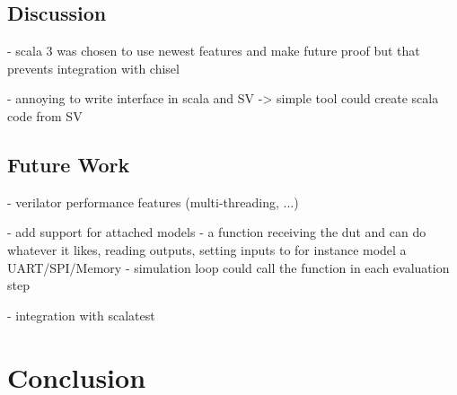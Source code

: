 \documentclass[12pt]{book}
\begin{document}
\section{Discussion} %

- scala 3 was chosen to use newest features and make future proof but that prevents integration with chisel

- annoying to write interface in scala and SV -> simple tool could create scala code from SV

\section{Future Work} %

- verilator performance features (multi-threading, ...)

- add support for attached models
- a function receiving the dut and can do whatever it likes, reading outputs, setting inputs to for instance model a
UART/SPI/Memory
- simulation loop could call the function in each evaluation step

- integration with scalatest

\chapter{Conclusion} %

\printbibliography
\end{document}
